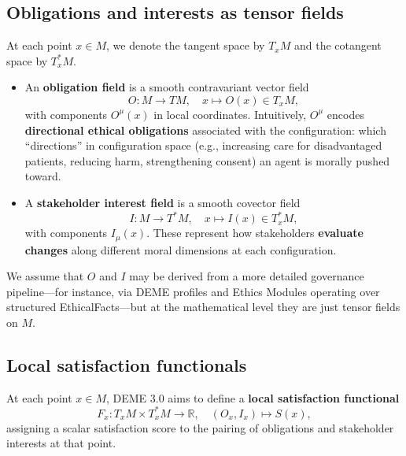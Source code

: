 \documentclass[12pt]{article}
\theoremstyle{remark}
\begin{document}
\subsection{Obligations and interests as tensor fields}

At each point $x \in M$, we denote the tangent space by $T_x M$ and the cotangent space by $T_x^* M$.

\begin{itemize}
    \item An \textbf{obligation field} is a smooth contravariant vector field
    \begin{equation}
        O\colon M \to TM,\quad x \mapsto O(x) \in T_x M,
    \end{equation}
    with components $O^\mu(x)$ in local coordinates. Intuitively, $O^\mu$ encodes \textbf{directional ethical obligations} associated with the configuration: which ``directions'' in configuration space (e.g., increasing care for disadvantaged patients, reducing harm, strengthening consent) an agent is morally pushed toward.

    \item A \textbf{stakeholder interest field} is a smooth covector field
    \begin{equation}
        I\colon M \to T^* M,\quad x \mapsto I(x) \in T_x^* M,
    \end{equation}
    with components $I_\mu(x)$. These represent how stakeholders \textbf{evaluate changes} along different moral dimensions at each configuration.
\end{itemize}

We assume that $O$ and $I$ may be derived from a more detailed governance pipeline---for instance, via DEME profiles and Ethics Modules operating over structured EthicalFacts---but at the mathematical level they are just tensor fields on $M$.

\subsection{Local satisfaction functionals}

At each point $x \in M$, DEME 3.0 aims to define a \textbf{local satisfaction functional}
\begin{equation}
    F_x\colon T_x M \times T_x^* M \to \mathbb{R},\quad (O_x, I_x) \mapsto S(x),
\end{equation}
assigning a scalar satisfaction score to the pairing of obligations and stakeholder interests at that point.
\end{document}
